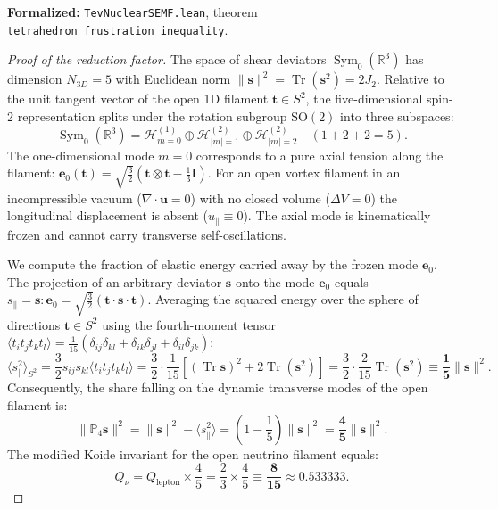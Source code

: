 \documentclass[11pt,a4paper]{article}
\theoremstyle{definition}
\theoremstyle{remark}
\begin{document}
\noindent\small\textbf{Formalized:} \texttt{TevNuclearSEMF.lean}, theorem \texttt{tetrahedron_frustration_inequality}.
	
\begin{proof}[Proof of the reduction factor]
The space of shear deviators $\operatorname{Sym}_0(\mathbb{R}^3)$ has dimension $N_{3D} = 5$ with Euclidean norm $\|\mathbf{s}\|^2 = \operatorname{Tr}(\mathbf{s}^2) = 2J_2$. Relative to the unit tangent vector of the open 1D filament $\mathbf{t} \in S^2$, the five-dimensional spin-2 representation splits under the rotation subgroup $\mathrm{SO}(2)$ into three subspaces:
\begin{equation}
    \operatorname{Sym}_0(\mathbb{R}^3) = \mathcal{H}_{m=0}^{(1)} \oplus \mathcal{H}_{|m|=1}^{(2)} \oplus \mathcal{H}_{|m|=2}^{(2)} \quad (1 + 2 + 2 = 5).
\end{equation}
The one-dimensional mode $m=0$ corresponds to a pure axial tension along the filament: $\mathbf{e}_0(\mathbf{t}) = \sqrt{\frac{3}{2}}(\mathbf{t} \otimes \mathbf{t} - \frac{1}{3}\mathbf{I})$. For an open vortex filament in an incompressible vacuum ($\nabla \cdot \mathbf{u} = 0$) with no closed volume ($\Delta V = 0$) the longitudinal displacement is absent ($u_\parallel \equiv 0$). The axial mode is kinematically frozen and cannot carry transverse self-oscillations.

We compute the fraction of elastic energy carried away by the frozen mode $\mathbf{e}_0$. The projection of an arbitrary deviator $\mathbf{s}$ onto the mode $\mathbf{e}_0$ equals $s_\parallel = \mathbf{s} : \mathbf{e}_0 = \sqrt{\frac{3}{2}}(\mathbf{t} \cdot \mathbf{s} \cdot \mathbf{t})$. Averaging the squared energy over the sphere of directions $\mathbf{t} \in S^2$ using the fourth-moment tensor $\langle t_i t_j t_k t_l \rangle = \frac{1}{15}(\delta_{ij}\delta_{kl} + \delta_{ik}\delta_{jl} + \delta_{il}\delta_{jk})$:
\begin{equation}
    \langle s_\parallel^2 \rangle_{S^2} = \frac{3}{2} s_{ij} s_{kl} \langle t_i t_j t_k t_l \rangle = \frac{3}{2} \cdot \frac{1}{15} \left[ (\operatorname{Tr}\mathbf{s})^2 + 2\operatorname{Tr}(\mathbf{s}^2) \right] = \frac{3}{2} \cdot \frac{2}{15} \operatorname{Tr}(\mathbf{s}^2) \equiv \frac{\mathbf{1}}{\mathbf{5}} \|\mathbf{s}\|^2.
    \label{eq:axial_mode_one_fifth_exact}
\end{equation}
Consequently, the share falling on the dynamic transverse modes of the open filament is:
\begin{equation}
    \|\mathbb{P}_4 \mathbf{s}\|^2 = \|\mathbf{s}\|^2 - \langle s_\parallel^2 \rangle = \left( 1 - \frac{1}{5} \right) \|\mathbf{s}\|^2 = \frac{\mathbf{4}}{\mathbf{5}} \|\mathbf{s}\|^2.
\end{equation}
The modified Koide invariant for the open neutrino filament equals:
\begin{equation}
    Q_\nu = Q_{\mathrm{lepton}} \times \frac{4}{5} = \frac{2}{3} \times \frac{4}{5} \equiv \frac{\mathbf{8}}{\mathbf{15}} \approx 0.533333.
\end{equation}
\end{proof}
	
\end{document}
